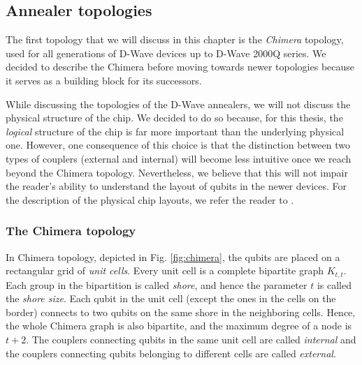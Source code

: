 
\subsection{Annealer topologies}

The first topology that we will discuss in this chapter is the \emph{Chimera}
topology, used for all generations of D-Wave devices up to D-Wave 2000Q series.
We decided to describe the Chimera before moving towards newer topologies
because it serves as a building block for its successors.

While discussing the topologies of the D-Wave annealers, we will not discuss
the physical structure of the chip. We decided to do so because, for this
thesis, the \emph{logical} structure of the chip is far more important than the
underlying physical one. However, one consequence of this choice is that the
distinction between two types of couplers (external and internal) will become
less intuitive once we reach beyond the Chimera topology. Nevertheless, we
believe that this will not impair the reader's ability to understand the layout
of qubits in the newer devices. For the description of the physical chip
layouts, we refer the reader to \cite{dwavedocs}.

\subsubsection{The Chimera topology}

In Chimera topology, depicted in Fig. \ref{fig:chimera}, the qubits are placed
on a rectangular grid of \emph{unit cells}. Every unit cell is a complete
bipartite graph $K_{t,t}$. Each group in the bipartition is called
\emph{shore}, and hence the parameter $t$ is called the \emph{shore size}. Each
qubit in the unit cell (except the ones in the cells on the border) connects to
two qubits on the same shore in the neighboring cells. Hence, the whole Chimera
graph is also bipartite, and the maximum degree of a node is $t+2$. The
couplers connecting qubits in the same unit cell are called \emph{internal} and
the couplers connecting qubits belonging to different cells are called
\emph{external}.

